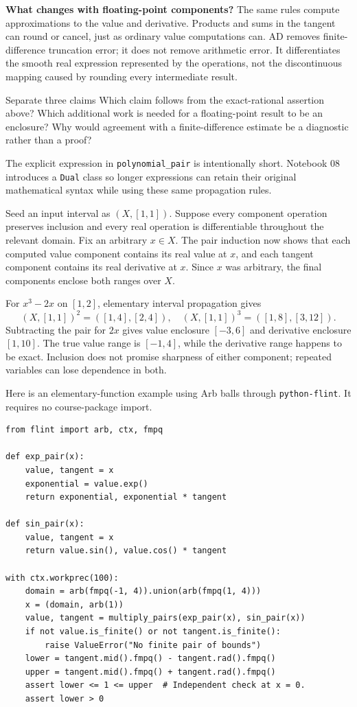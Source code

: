 \textbf{What changes with floating-point components?} The same rules compute
approximations to the value and derivative. Products and sums in the tangent
can round or cancel, just as ordinary value computations can. AD removes
finite-difference truncation error; it does not remove arithmetic error.
It differentiates the smooth real expression represented by the operations,
not the discontinuous mapping caused by rounding every intermediate result.

\begin{question}{Separate three claims}
Which claim follows from the exact-rational assertion above? Which additional
work is needed for a floating-point result to be an enclosure? Why would
agreement with a finite-difference estimate be a diagnostic rather than a proof?
\end{question}

The explicit expression in \texttt{polynomial\_pair} is intentionally short.
Notebook 08 introduces a \texttt{Dual} class so longer expressions can retain
their original mathematical syntax while using these same propagation rules.

\newpage
{}
Seed an input interval as $(X,[1,1])$. Suppose every component operation
preserves inclusion and every real operation is differentiable throughout
the relevant domain. Fix an arbitrary $x\in X$. The pair induction now shows
that each computed value component contains its real value at $x$, and each
tangent component contains its real derivative at $x$. Since $x$ was
arbitrary, the final components enclose both ranges over $X$.

For $x^3-2x$ on $[1,2]$, elementary interval propagation gives
\[
 (X,[1,1])^2=([1,4],[2,4]),\quad
 (X,[1,1])^3=([1,8],[3,12]).
\]
Subtracting the pair for $2x$ gives value enclosure $[-3,6]$ and derivative
enclosure $[1,10]$. The true value range is $[-1,4]$, while the derivative
range happens to be exact. Inclusion does not promise sharpness of either
component; repeated variables can lose dependence in both.

Here is an elementary-function example using Arb balls through
\texttt{python-flint}. It requires no course-package import.
\begin{lstlisting}
from flint import arb, ctx, fmpq

def exp_pair(x):
    value, tangent = x
    exponential = value.exp()
    return exponential, exponential * tangent

def sin_pair(x):
    value, tangent = x
    return value.sin(), value.cos() * tangent

with ctx.workprec(100):
    domain = arb(fmpq(-1, 4)).union(arb(fmpq(1, 4)))
    x = (domain, arb(1))
    value, tangent = multiply_pairs(exp_pair(x), sin_pair(x))
    if not value.is_finite() or not tangent.is_finite():
        raise ValueError("No finite pair of bounds")
    lower = tangent.mid().fmpq() - tangent.rad().fmpq()
    upper = tangent.mid().fmpq() + tangent.rad().fmpq()
    assert lower <= 1 <= upper  # Independent check at x = 0.
    assert lower > 0
\end{lstlisting}


